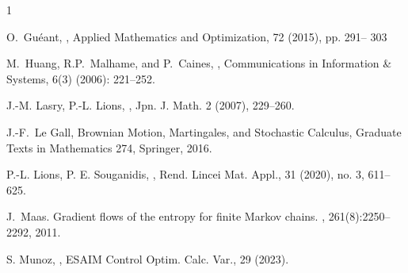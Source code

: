 \documentclass[10pt]{article}
\numberwithin{equation}{section}
\begin{document}
\begin{thebibliography}{1}
{ O.~Gu\'eant, 
,  
\newblock   Applied Mathematics and Optimization, 72 (2015), pp. 291-- 303


 M.~Huang, R.P.~Malhame, and P.~Caines, 
,
\newblock Communications in Information \& Systems, 6(3) (2006): 221--252.

 J.-M. Lasry, P.-L. Lions, 
,  
\newblock Jpn. J. Math.  2  (2007),    229--260.


 J.-F.~Le Gall,
\newblock Brownian Motion, Martingales, and Stochastic Calculus,
\newblock Graduate Texts in Mathematics 274, Springer, 2016.

 P.-L. Lions, P. E. Souganidis, 
, 
\newblock  Rend. Lincei Mat. Appl., 31 (2020), no. 3, 611--625.

J.~Maas.
\newblock Gradient flows of the entropy for finite {{Markov}} chains.
, 261(8):2250--2292, 2011.


S. Munoz, 
, 
\newblock ESAIM Control Optim. Calc. Var., 29 (2023).



}


\end{thebibliography}
\end{document}
